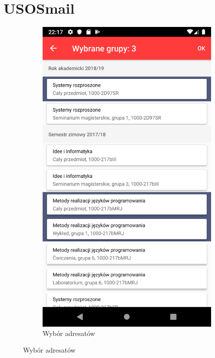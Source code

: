 \documentclass{pracamgr}
\begin{document}
\section{USOSmail}

\begin{figure}[p]
	\centering
	\begin{subfigure}[t]{0.3\textwidth}
		\includegraphics[width=\textwidth]{img/usosmail_to.png}
		\caption{Wybór adresatów}
		\label{fig:usosmail_to}
	\end{subfigure}

\end{figure}
\end{document}
